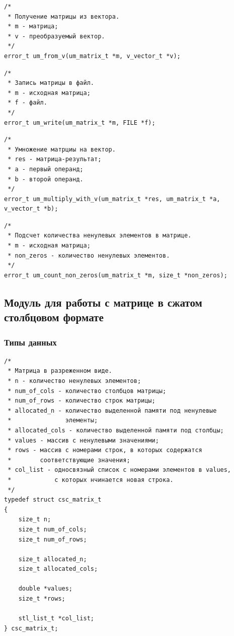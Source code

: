 \documentclass[a4paper,12pt]{extarticle}
\begin{document}
 \vspace{0.5cm}

\begin{verbatim}
/*
 * Получение матрицы из вектора.
 * m - матрица;
 * v - преобразуемый вектор.
 */
error_t um_from_v(um_matrix_t *m, v_vector_t *v);
\end{verbatim}


 \vspace{0.5cm}

\begin{verbatim}
/*
 * Запись матрицы в файл.
 * m - исходная матрица;
 * f - файл.
 */
error_t um_write(um_matrix_t *m, FILE *f);
\end{verbatim}


 \vspace{0.5cm}

\begin{verbatim}
/*
 * Умножение матрциы на вектор.
 * res - матрица-результат;
 * a - первый операнд;
 * b - второй операнд.
 */
error_t um_multiply_with_v(um_matrix_t *res, um_matrix_t *a, v_vector_t *b);
\end{verbatim}


 \vspace{0.5cm}

\begin{verbatim}
/*
 * Подсчет количества ненулевых элементов в матрице.
 * m - исходная матрица;
 * non_zeros - количество ненулевых элементов.
 */
error_t um_count_non_zeros(um_matrix_t *m, size_t *non_zeros);
\end{verbatim}


 \vspace{0.5cm}

\subsection{Модуль для работы с матрице в сжатом столбцовом формате}


\subsubsection{Типы данных}
\begin{verbatim}
/*
 * Матрица в разреженном виде.
 * n - количество ненулевых элементов;
 * num_of_cols - количество столбцов матрицы;
 * num_of_rows - количество строк матрицы;
 * allocated_n - количество выделенной памяти под ненулевые
 *               элементы;
 * allocated_cols - количество выделенной памяти под столбцы;
 * values - массив с ненулевыми значениями;
 * rows - массив с номерами строк, в которых содержатся
 *        соответствующие значения;
 * col_list - односвязный список с номерами элементов в values,
 *            с которых нчинается новая строка.
 */
typedef struct csc_matrix_t
{
    size_t n;
    size_t num_of_cols;
    size_t num_of_rows;

    size_t allocated_n;
    size_t allocated_cols;

    double *values;
    size_t *rows;

    stl_list_t *col_list;
} csc_matrix_t;
\end{verbatim}
\end{document}
